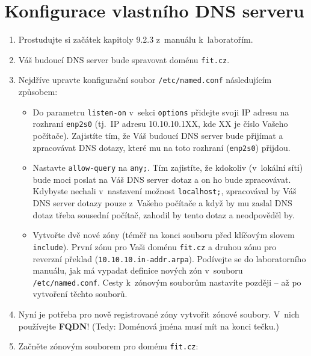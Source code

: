 \section{Konfigurace vlastního DNS serveru}
\begin{enumerate}
  \item Prostudujte si začátek kapitoly 9.2.3 z~manuálu k~laboratořím.
  \item Váš budoucí DNS server bude spravovat doménu  {\tt fit.cz}.
  \item Nejdříve upravte konfigurační soubor {\tt /etc/named.conf} následujícím způsobem:
    \begin{itemize}
      \item Do parametru {\tt listen-on} v~sekci {\tt options} přidejte svoji IP adresu na rozhraní {\tt enp2s0}
            (tj.~IP adresu 10.10.10.1XX, kde XX je číslo Vašeho počítače).
            Zajistíte tím, že Váš budoucí DNS server bude přijímat a zpracovávat DNS dotazy, které mu na toto rozhraní ({\tt enp2s0}) přijdou. 
      \item Nastavte {\tt allow-query} na {\tt any;}.
            Tím zajistíte, že kdokoliv (v~lokální síti) bude moci poslat na Váš DNS server dotaz a on ho bude zpracovávat.
            Kdybyste nechali v~nastavení možnost {\tt localhost;}, zpracovával by Váš DNS server dotazy pouze z~Vašeho počítače a
            když by mu zaslal DNS dotaz třeba sousední počítač, zahodil by tento dotaz a neodpověděl by.
      \item Vytvořte dvě nové zóny (téměř na konci souboru před klíčovým slovem {\tt include}). První zónu pro Vaši doménu {\tt fit.cz} a druhou zónu pro reverzní překlad ({\tt 10.10.10.in-addr.arpa}).
            Podívejte se do laboratorního manuálu, jak má vypadat definice nových zón v~souboru {\tt /etc/named.conf}.
            Cesty k~zónovým souborům nastavíte později -- až po vytvoření těchto souborů.
    \end{itemize}
  
  \item Nyní je potřeba pro nově registrované zóny vytvořit zónové soubory. V~nich používejte \textbf{FQDN}! (Tedy: Doménová jména musí mít na konci tečku.)
  \item Začněte zónovým souborem pro doménu {\tt fit.cz}:
  

\end{enumerate}
